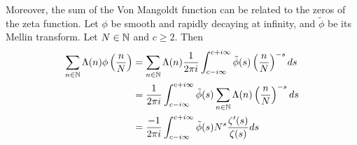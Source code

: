 Moreover, the sum of the Von Mangoldt function can be related to the zeros of the zeta function.
Let $\phi$ be smooth and rapidly decaying at infinity, and $\tilde{\phi}$ be its Mellin transform. Let $N\in\mathbb{N}$ and $c\geq 2$. Then \begin{equation} \label{mellinonzeta}
    \begin{split}
    \sum_{n\in\mathbb{N}} \Lambda(n) \phi\left(\frac{n}{N}\right) &=
    \sum_{n\in\mathbb{N}} \Lambda(n) \frac{1}{2\pi i}\int_{c-i\infty}^{c+i\infty}
    \tilde{\phi}(s)\left(\frac{n}{N}\right)^{-s} ds \\
    &= \frac{1}{2\pi i}\int_{c-i\infty}^{c+i\infty}
    \tilde{\phi}(s)\sum_{n\in\mathbb{N}} \Lambda(n) \left(\frac{n}{N}\right)^{-s} ds \\
    &= \frac{-1}{2\pi i}\int_{c-i\infty}^{c+i\infty}
    \tilde{\phi}(s) N^s \frac{\zeta'(s)}{\zeta(s)} ds \\
    \end{split}
\end{equation}

